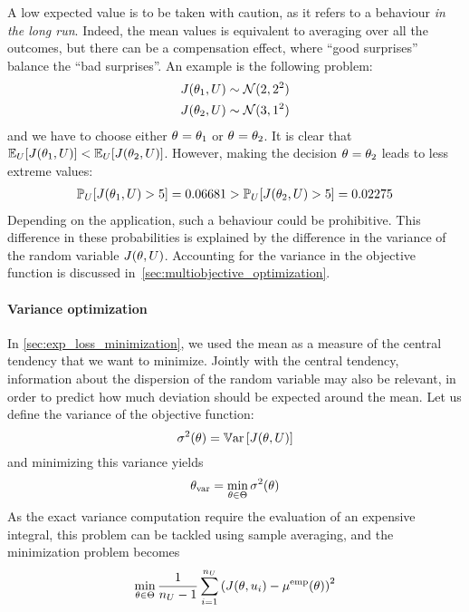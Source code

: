 \documentclass[../../Main_ManuscritThese.tex]{subfiles}
\begin{document}
A low expected value is to be taken with caution, as it refers to a behaviour \emph{in the long run}. Indeed, the mean values is equivalent to averaging over all the outcomes, but there can be a compensation effect, where ``good surprises'' balance the ``bad surprises''.
An example is the following problem:
\begin{align}
  J(\theta_1, U) &\sim \mathcal{N}(2, 2^2) \\
  J(\theta_2, U) & \sim \mathcal{N}(3, 1^2)
\end{align}
and we have to choose either ${\theta}_{\mathrm{}}=\theta_1$ or ${\theta}_{\mathrm{}} = \theta_2$.
It is clear that $\mathbb{E}_{U}[J(\theta_1, U)] < \mathbb{E}_{U}[J(\theta_2, U)]$. However, making the decision ${\theta}_{\mathrm{}} = \theta_2$ leads to less extreme values:
\begin{align}
  \mathbb{P}_{U}[J(\theta_1, U) > 5] = 0.06681> \mathbb{P}_{U}[J(\theta_2, U) > 5] = 0.02275
\end{align}
Depending on the application, such a behaviour could be prohibitive.
This difference in these probabilities is explained by the difference in the variance of the random variable $J(\theta, U)$.
Accounting for the variance in the objective function is discussed in~\cref{sec:multiobjective_optimization}.

\paragraph{Variance optimization}
In \cref{sec:exp_loss_minimization}, we used the mean as a measure of the central tendency that we want to minimize. Jointly with the central tendency, information about the dispersion of the random variable may also be relevant, in order to predict how much deviation should be expected around the mean.
Let us define the variance of the objective function:
\begin{equation}
  \sigma^2(\theta) = \mathbb{V}\mathrm{ar}\left[J(\theta,U)\right]
\end{equation}
and minimizing this variance yields
\begin{equation}
  {\theta}_{\mathrm{var}} = \min_{\theta \in \Theta} \sigma^2(\theta)
\end{equation}
As the exact variance computation require the evaluation of an expensive integral, this problem can be tackled using sample averaging, and the minimization problem becomes
\begin{equation}
  \min_{\theta\in \Theta} \frac{1}{n_{U}-1} \sum_{i=1}^{n_{U}} \left(J(\theta, u_i) - \mu^{\mathrm{emp}}(\theta)\right)^2
\end{equation}
\end{document}
